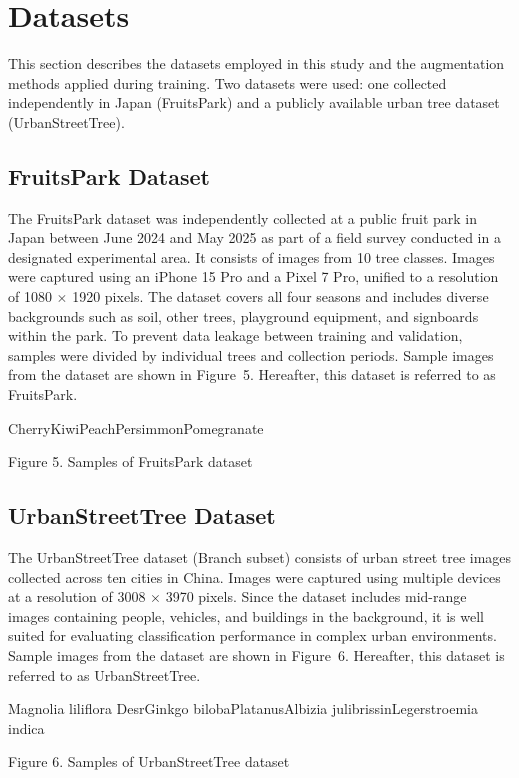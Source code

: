 \section{Datasets}

This section describes the datasets employed in this study and the augmentation methods applied during training. Two datasets were used: one collected independently in Japan (FruitsPark) and a publicly available urban tree dataset (UrbanStreetTree).

\subsection{FruitsPark Dataset}
The FruitsPark dataset was independently collected at a public fruit park in Japan between June 2024 and May 2025 as part of a field survey conducted in a designated experimental area. It consists of images from 10 tree classes. Images were captured using an iPhone 15 Pro and a Pixel 7 Pro, unified to a resolution of 1080 $\times$ 1920 pixels. The dataset covers all four seasons and includes diverse backgrounds such as soil, other trees, playground equipment, and signboards within the park. To prevent data leakage between training and validation, samples were divided by individual trees and collection periods. Sample images from the dataset are shown in Figure~5. Hereafter, this dataset is referred to as FruitsPark.

Cherry\quad Kiwi\quad Peach\quad Persimmon\quad Pomegranate

Figure 5. Samples of FruitsPark dataset

\subsection{UrbanStreetTree Dataset}
The UrbanStreetTree dataset (Branch subset) consists of urban street tree images collected across ten cities in China. \cite{ref11} Images were captured using multiple devices at a resolution of 3008 $\times$ 3970 pixels. Since the dataset includes mid-range images containing people, vehicles, and buildings in the background, it is well suited for evaluating classification performance in complex urban environments. Sample images from the dataset are shown in Figure~6. Hereafter, this dataset is referred to as UrbanStreetTree.

Magnolia liliflora Desr\quad Ginkgo biloba\quad Platanus\quad Albizia julibrissin\quad Legerstroemia indica

Figure 6. Samples of UrbanStreetTree dataset \cite{ref11}

